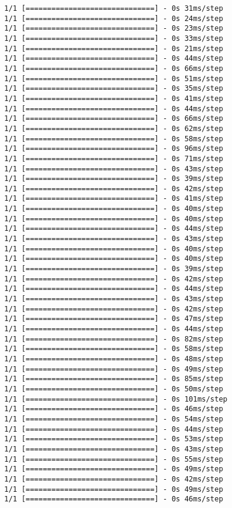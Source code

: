 \documentclass[11pt]{article}
\begin{document}
\begin{Verbatim}[commandchars=\\\{\}]
1/1 [==============================] - 0s 31ms/step
1/1 [==============================] - 0s 24ms/step
1/1 [==============================] - 0s 23ms/step
1/1 [==============================] - 0s 33ms/step
1/1 [==============================] - 0s 21ms/step
1/1 [==============================] - 0s 44ms/step
1/1 [==============================] - 0s 66ms/step
1/1 [==============================] - 0s 51ms/step
1/1 [==============================] - 0s 35ms/step
1/1 [==============================] - 0s 41ms/step
1/1 [==============================] - 0s 44ms/step
1/1 [==============================] - 0s 66ms/step
1/1 [==============================] - 0s 62ms/step
1/1 [==============================] - 0s 58ms/step
1/1 [==============================] - 0s 96ms/step
1/1 [==============================] - 0s 71ms/step
1/1 [==============================] - 0s 43ms/step
1/1 [==============================] - 0s 39ms/step
1/1 [==============================] - 0s 42ms/step
1/1 [==============================] - 0s 41ms/step
1/1 [==============================] - 0s 40ms/step
1/1 [==============================] - 0s 40ms/step
1/1 [==============================] - 0s 44ms/step
1/1 [==============================] - 0s 43ms/step
1/1 [==============================] - 0s 40ms/step
1/1 [==============================] - 0s 40ms/step
1/1 [==============================] - 0s 39ms/step
1/1 [==============================] - 0s 42ms/step
1/1 [==============================] - 0s 44ms/step
1/1 [==============================] - 0s 43ms/step
1/1 [==============================] - 0s 42ms/step
1/1 [==============================] - 0s 47ms/step
1/1 [==============================] - 0s 44ms/step
1/1 [==============================] - 0s 82ms/step
1/1 [==============================] - 0s 58ms/step
1/1 [==============================] - 0s 48ms/step
1/1 [==============================] - 0s 49ms/step
1/1 [==============================] - 0s 85ms/step
1/1 [==============================] - 0s 50ms/step
1/1 [==============================] - 0s 101ms/step
1/1 [==============================] - 0s 46ms/step
1/1 [==============================] - 0s 54ms/step
1/1 [==============================] - 0s 44ms/step
1/1 [==============================] - 0s 53ms/step
1/1 [==============================] - 0s 43ms/step
1/1 [==============================] - 0s 55ms/step
1/1 [==============================] - 0s 49ms/step
1/1 [==============================] - 0s 42ms/step
1/1 [==============================] - 0s 49ms/step
1/1 [==============================] - 0s 46ms/step

\end{Verbatim}
\end{document}
